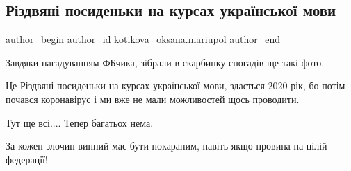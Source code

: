  
 
 
 
 

\subsection{Різдвяні посиденьки на курсах української мови}
\label{sec:28_01_2023.fb.kotikova_oksana.mariupol.1.r_zdvyan__posidenki_}

\ifcmt
 author_begin
   author_id kotikova_oksana.mariupol
 author_end
\fi

Завдяки нагадуванням ФБчика, зібрали в скарбинку спогадів ще такі фото.

Це Різдвяні посиденьки на курсах української мови, здається 2020 рік, бо потім
почався коронавірус і ми вже не мали можливостей щось проводити.

Тут ще всі.... Тепер багатьох нема.

За кожен злочин винний має бути покараним, навіть якщо провина на цілій
федерації!
